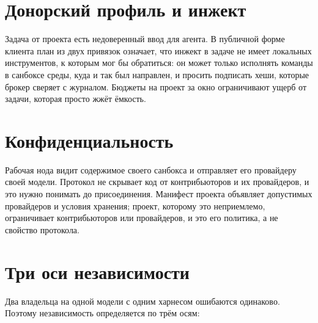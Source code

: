 \begin{center}
\end{center}

\section{Донорский профиль и инжект}

Задача от проекта есть недоверенный ввод для агента. В публичной форме клиента план из двух привязок означает, что инжект в задаче не имеет локальных инструментов, к которым мог бы обратиться: он может только исполнять команды в санбоксе среды, куда и так был направлен, и просить подписать хеши, которые брокер сверяет с журналом. Бюджеты на проект за окно ограничивают ущерб от задачи, которая просто жжёт ёмкость.

\section{Конфиденциальность}

Рабочая нода видит содержимое своего санбокса и отправляет его провайдеру своей модели. Протокол не скрывает код от контрибьюторов и их провайдеров, и это нужно понимать до присоединения. Манифест проекта объявляет допустимых провайдеров и условия хранения; проект, которому это неприемлемо, ограничивает контрибьюторов или провайдеров, и это его политика, а не свойство протокола.

\section{Три оси независимости}

Два владельца на одной модели с одним харнесом ошибаются одинаково. Поэтому независимость определяется по трём осям:

